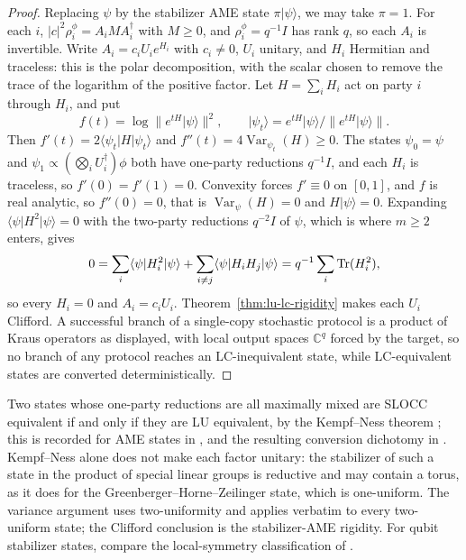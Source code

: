 \begin{proof}
Replacing \(\psi\) by the stabilizer AME state \(\pi\lvert\psi\rangle\),
we may take \(\pi=1\).  For each \(i\), \(|c|^2\rho^\phi_i=A_iMA_i^\dagger\)
with \(M\geq0\), and \(\rho^\phi_i=q^{-1}I\) has rank \(q\), so each
\(A_i\) is invertible.  Write \(A_i=c_iU_ie^{H_i}\) with \(c_i\neq0\), \(U_i\)
unitary, and \(H_i\) Hermitian and traceless: this is the polar
decomposition, with the scalar chosen to remove the trace of the logarithm
of the positive factor.  Let \(H=\sum_iH_i\) act on party \(i\) through
\(H_i\), and put
\[
 f(t)=\log\bigl\|e^{tH}\lvert\psi\rangle\bigr\|^2,\qquad
 \lvert\psi_t\rangle
 =e^{tH}\lvert\psi\rangle\big/\bigl\|e^{tH}\lvert\psi\rangle\bigr\| .
\]
Then \(f'(t)=2\langle\psi_t\rvert H\lvert\psi_t\rangle\) and
\(f''(t)=4\operatorname{Var}_{\psi_t}(H)\geq0\).  The states
\(\psi_0=\psi\) and \(\psi_1\propto(\bigotimes_iU_i^\dagger)\phi\) both
have one-party reductions \(q^{-1}I\), and each \(H_i\) is traceless, so
\(f'(0)=f'(1)=0\).  Convexity forces \(f'\equiv0\) on \([0,1]\), and
\(f\) is real analytic, so \(f''(0)=0\), that is
\(\operatorname{Var}_\psi(H)=0\) and \(H\lvert\psi\rangle=0\).  Expanding
\(\langle\psi\rvert H^2\lvert\psi\rangle=0\) with the two-party
reductions \(q^{-2}I\) of \(\psi\), which is where \(m\geq2\) enters,
gives
\[
 0=\sum_i\langle\psi\rvert H_i^2\lvert\psi\rangle
  +\sum_{i\neq j}\langle\psi\rvert H_iH_j\lvert\psi\rangle
  =q^{-1}\sum_i\operatorname{Tr}(H_i^2),
\]
so every \(H_i=0\) and \(A_i=c_iU_i\).
Theorem~\ref{thm:lu-lc-rigidity} makes each \(U_i\) Clifford.  A
successful branch of a single-copy stochastic protocol is a product of
Kraus operators as displayed, with local output spaces \(\mathbb C^q\)
forced by the target, so no branch of any protocol reaches an
LC-inequivalent state, while LC-equivalent states are converted
deterministically.
\end{proof}

Two states whose one-party reductions are all maximally mixed are SLOCC
equivalent if and only if they are LU equivalent, by the Kempf--Ness
theorem \cite{KempfNess1979,GourWallach2011}; this is recorded for AME
states in \cite[Corollary~1]{BurchardtRaissi2020}, and the resulting
conversion dichotomy in \cite{RajchelMieldziocEtAl2026}.  Kempf--Ness
alone does not
make each factor unitary: the stabilizer of such a state in the product of
special linear groups is reductive and may contain a torus, as it does for
the Greenberger--Horne--Zeilinger state, which is one-uniform.  The
variance argument uses two-uniformity and applies verbatim to every
two-uniform state; the Clifford conclusion is the stabilizer-AME rigidity.
For qubit stabilizer states, compare the local-symmetry classification of
\cite{EnglbrechtKraus2020}.

